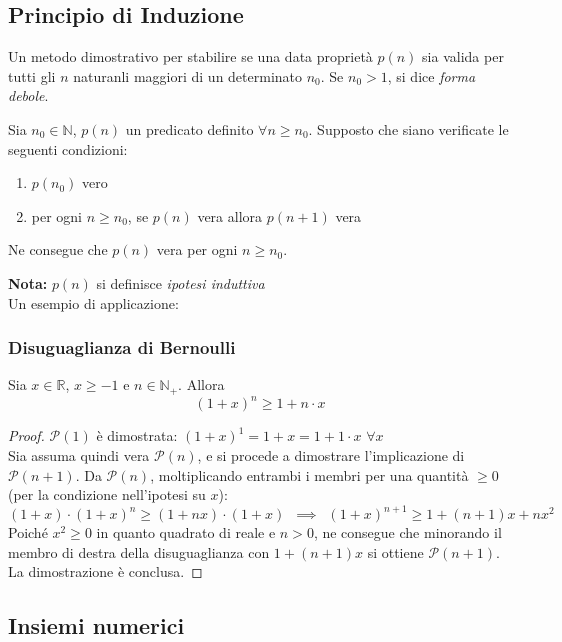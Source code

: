 \documentclass[10pt]{article}
\theoremstyle{plain}
\begin{document}
\subsection{Principio di Induzione}
Un metodo dimostrativo per stabilire se una data proprietà $p(n)$ sia valida per tutti gli $n$ naturanli maggiori di un determinato $n_0$. Se $n_0 > 1$, si dice \textit{forma debole}.
\begin{ther}
Sia $n_0 \in \mathbb{N}$, $p(n)$ un predicato definito $\forall n \geq n_0$. Supposto che siano verificate le seguenti condizioni:
\begin{enumerate}[label = \Roman*)]
    \item $p(n_0)$ vero
    \item per ogni $n \geq n_0$, se $p(n)$ vera allora $p(n+1)$ vera
\end{enumerate}
Ne consegue che $p(n)$ vera per ogni $n \geq n_0$.
\end{ther}
\textbf{Nota:} $p(n)$ si definisce \textit{ipotesi induttiva}
\\Un esempio di applicazione:
\subsubsection{Disuguaglianza di Bernoulli}
\begin{prop}
    Sia $x \in \mathbb{R}$, $x \geq -1$ e $n \in \mathbb{N}_+$. Allora
    \[(1+x)^n \geq 1 + n\cdot x\]
\end{prop}
\begin{proof}
$\mathcal{P}(1)$ è dimostrata: $(1 + x)^1 = 1 + x = 1 + 1 \cdot x$ $\forall x$
\\Sia assuma quindi vera $\mathcal{P}(n)$, e si procede a dimostrare l'implicazione di $\mathcal{P}(n+1)$. Da $\mathcal{P}(n)$, moltiplicando entrambi i membri per una quantità $\geq 0$ (per la condizione nell'ipotesi su $x$):
\[(1 + x) \cdot (1 + x)^n \geq (1 + n x) \cdot (1+x) \enspace \implies \enspace (1+x)^{n+1} \geq 1 + (n+1) x + n x^2\]
Poiché $x^2 \geq 0$ in quanto quadrato di reale e $n > 0$, ne consegue che minorando il membro di destra della disuguaglianza con $1 + (n+1) x$ si ottiene $\mathcal{P}(n+1)$. La dimostrazione è conclusa.
\end{proof}

\subsection{Insiemi numerici}
\end{document}
